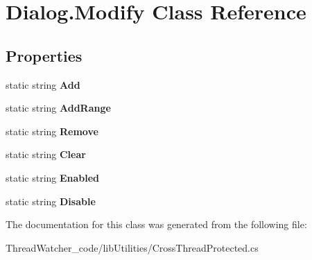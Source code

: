 \hypertarget{class_dialog_1_1_modify}{\section{Dialog.\+Modify Class Reference}
\label{class_dialog_1_1_modify}
}
\subsection*{Properties}
\begin{DoxyCompactItemize}
\item 
\hypertarget{class_dialog_1_1_modify_ad09d986755271796da3c7dc7919b4857}{static string {\bfseries Add}}\label{class_dialog_1_1_modify_ad09d986755271796da3c7dc7919b4857}

\item 
\hypertarget{class_dialog_1_1_modify_a5dda02fe3f8936d8e1c5dbe55128d6b6}{static string {\bfseries Add\+Range}}\label{class_dialog_1_1_modify_a5dda02fe3f8936d8e1c5dbe55128d6b6}

\item 
\hypertarget{class_dialog_1_1_modify_a5f88224eec872c07d6104efa91788c13}{static string {\bfseries Remove}}\label{class_dialog_1_1_modify_a5f88224eec872c07d6104efa91788c13}

\item 
\hypertarget{class_dialog_1_1_modify_a2003dcf9896ca7e96fb9bfe20976387d}{static string {\bfseries Clear}}\label{class_dialog_1_1_modify_a2003dcf9896ca7e96fb9bfe20976387d}

\item 
\hypertarget{class_dialog_1_1_modify_ae47a9cda76d0a38f3a0e196e0d1a4c91}{static string {\bfseries Enabled}}\label{class_dialog_1_1_modify_ae47a9cda76d0a38f3a0e196e0d1a4c91}

\item 
\hypertarget{class_dialog_1_1_modify_a2790770f34c6e8b85d238254b7d36b5c}{static string {\bfseries Disable}}\label{class_dialog_1_1_modify_a2790770f34c6e8b85d238254b7d36b5c}

\end{DoxyCompactItemize}


The documentation for this class was generated from the following file\+:\begin{DoxyCompactItemize}
\item 
Thread\+Watcher\+\_\+code/lib\+Utilities/Cross\+Thread\+Protected.\+cs\end{DoxyCompactItemize}
